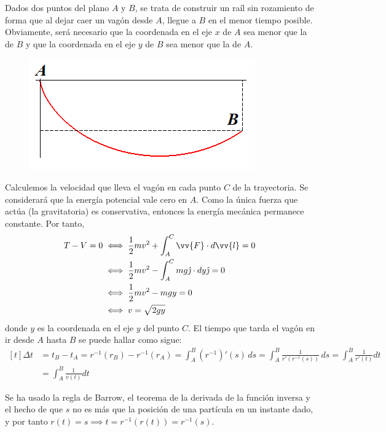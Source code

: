 \documentclass[12pt]{report}
\begin{document}
\begin{example}[Braquistócrona]
Dados dos puntos del plano $A$ y $B$, se trata de construir un raíl sin rozamiento de forma que al dejar caer un vagón desde $A$, llegue a $B$ en el menor tiempo posible. Obviamente, será necesario que la coordenada en el eje $x$ de $A$ sea menor que la de $B$ y que la coordenada en el eje $y$ de $B$ sea menor que la de $A$.

\begin{figure}[h]
\includegraphics[scale = 0.5]{1.1_2}
\centering
\end{figure}

\vspace{2mm}
Calculemos la velocidad que lleva el vagón en cada punto $C$ de la trayectoria. Se considerará que la energía potencial vale cero en $A$. Como la única fuerza que actúa (la gravitatoria) es conservativa, entonces la energía mecánica permanece constante. Por tanto,
\[
\begin{aligned}[t]
T - V = 0 &\iff \frac{1}{2}mv^2 + \int_A^C \vv{F} \cdot d\vv{l} = 0 \\
&\iff \frac{1}{2}mv^2 - \int_A^C mg\hat{\jmath} \cdot dy\hat{\jmath} = 0 \\
&\iff \frac{1}{2}mv^2 - mgy = 0 \\
&\iff v = \sqrt{2gy} 
\end{aligned}
\]
donde $y$ es la coordenada en el eje $y$ del punto $C$. El tiempo que tarda el vagón en ir desde $A$ hasta $B$ se puede hallar como sigue:
\[
\begin{aligned}[t]
\Delta t &= t_B - t_A = r^{-1}(r_B) - r^{-1}(r_A) = \int_A^B (r^{-1})'(s) \, ds = \int_A^B \frac{1}{r'(r^{-1}(s))} \, ds = \int_A^B \frac{1}{r'(t)}dt \\ 
&= \int_A^B \frac{1}{v(t)}dt
\end{aligned}
\]

Se ha usado la regla de Barrow, el teorema de la derivada de la función inversa y el hecho de que $s$ no es más que la posición de una partícula en un instante dado, y por tanto $r(t) = s \implies t = r^{-1}(r(t)) = r^{-1}(s)$.


\end{example}
\end{document}
